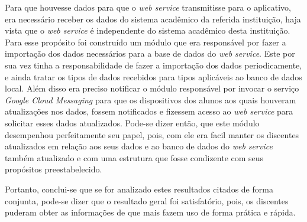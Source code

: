 	
	\par Para que houvesse dados para que o \textit{web service} transmitisse para
o aplicativo, era necessário receber os dados do sistema acadêmico da referida
instituição, haja vista que o \textit{web service} é independente do sistema
acadêmico desta instituição. Para esse propósito foi construído um módulo que
era responsável por fazer a importação dos dados necessários para a base de
dados do \textit{web service}. Este por sua vez tinha a responsabilidade de
fazer a importação dos dados periodicamente, e ainda tratar os tipos de dados
recebidos para tipos aplicáveis ao banco de dados local. Além disso era
preciso notificar o módulo responsável por invocar o serviço \textit{Google
Cloud Messaging} para que os dispositivos dos alunos aos quais houveram
atualizações nos dados, fossem notificados e fizessem acesso ao \textit{web
service} para solicitar esses dados atualizados. Pode-se dizer então, que este
módulo desempenhou perfeitamente seu papel, pois, com ele era facil manter os
discentes atualizados em relação aos seus dados e ao banco de dados do
\textit{web service} também atualizado e com uma estrutura que fosse condizente
com seus propósitos preestabelecido. 
	
	\par Portanto, conclui-se que se for analizado estes resultados citados de
forma conjunta, pode-se dizer que o resultado geral foi satisfatório, pois, os
discentes puderam obter as informações de que mais fazem uso de forma prática e
rápida.


